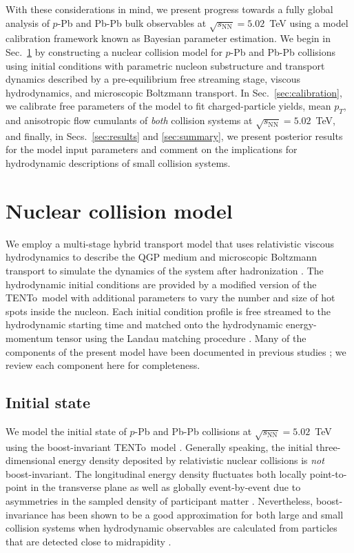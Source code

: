 \documentclass[aps,prc,reprint,amsmath,nofootinbib]{revtex4-1}
\newcommand{\trento}{T\raisebox{-0.5ex}{R}ENTo}
\newcommand{\sqrts}{\sqrt{s_\mathrm{NN}}}
\begin{document}
With these considerations in mind, we present progress towards a fully global analysis of $p$-Pb and Pb-Pb bulk observables at $\sqrts=5.02$~TeV using a model calibration framework known as Bayesian parameter estimation.
We begin in Sec.~\ref{sec:model} by constructing a nuclear collision model for $p$-Pb and Pb-Pb collisions using initial conditions with parametric nucleon substructure and transport dynamics described by a pre-equilibrium free streaming stage, viscous hydrodynamics, and microscopic Boltzmann transport.
In Sec.~\ref{sec:calibration}, we calibrate free parameters of the model to fit charged-particle yields, mean $p_T$, and anisotropic flow cumulants of \emph{both} collision systems at $\sqrts=5.02$~TeV, and finally, in Secs.~\ref{sec:results} and \ref{sec:summary}, we present posterior results for the model input parameters and comment on the implications for hydrodynamic descriptions of small collision systems.


\section{Nuclear collision model}
\label{sec:model}

We employ a multi-stage hybrid transport model that uses relativistic viscous hydrodynamics to describe the QGP medium and microscopic Boltzmann transport to simulate the dynamics of the system after hadronization \cite{Shen:2014vra, Bernhard:2016tnd}.
The hydrodynamic initial conditions are provided by a modified version of the \trento\ model \cite{Moreland:2014oya} with additional parameters to vary the number and size of hot spots inside the nucleon.
Each initial condition profile is free streamed to the hydrodynamic starting time and matched onto the hydrodynamic energy-momentum tensor using the Landau matching procedure \cite{Broniowski:2008qk, Heinz:2015arc}.
Many of the components of the present model have been documented in previous studies \cite{Moreland:2014oya, Bernhard:2016tnd, Bernhard:2018hnz}; we review each component here for completeness.

\subsection{Initial state}
\label{sec:initial_state}

We model the initial state of $p$-Pb and Pb-Pb collisions at $\sqrts=5.02$~TeV using the boost-invariant \trento\ model \cite{Moreland:2014oya}.
Generally speaking, the initial three-dimensional energy density deposited by relativistic nuclear collisions is \emph{not} boost-invariant.
The longitudinal energy density fluctuates both locally point-to-point in the transverse plane as well as globally event-by-event due to asymmetries in the sampled density of participant matter \cite{Ke:2016jrd, Bozek:2010vz}.
Nevertheless, boost-invariance has been shown to be a good approximation for both large and small collision systems when hydrodynamic observables are calculated from particles that are detected close to midrapidity \cite{Shen:2016zpp}.
\end{document}
